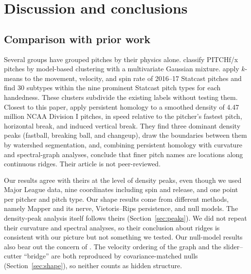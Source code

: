 \documentclass{article}
\theoremstyle{definition}
\theoremstyle{remark}
\begin{document}
\section{Discussion and conclusions}\label{sec:discussion}
\subsection{Comparison with prior work}\label{sec:prior}
Several groups have grouped pitches by their physics alone.
\textcite{pane2013trouble} classify PITCHf/x pitches by model-based clustering with a multivariate Gaussian mixture.
\textcite{camp2020clustering} apply $k$-means to the movement, velocity, and spin rate of 2016--17 Statcast pitches and find 30 subtypes within the nine prominent Statcast pitch types for each handedness. These clusters subdivide the existing labels without testing them.
Closest to this paper, \textcite{maloof2026classify} apply persistent homology to a smoothed density of 4.47 million NCAA Division I pitches, in speed relative to the pitcher's fastest pitch, horizontal break, and induced vertical break.
They find three dominant density peaks (fastball, breaking ball, and changeup), draw the boundaries between them by watershed segmentation, and, combining persistent homology with curvature and spectral-graph analyses, conclude that finer pitch names are locations along continuous ridges. Their article is not peer-reviewed.

Our results agree with theirs at the level of density peaks, even though we used Major League data, nine coordinates including spin and release, and one point per pitcher and pitch type.
Our shape results come from different methods, namely Mapper and its nerve, Vietoris--Rips persistence, and null models. The density-peak analysis itself follows theirs (Section~\ref{sec:peaks}).
We did not repeat their curvature and spectral analyses, so their conclusion about ridges is consistent with our picture but not something we tested.
Our null-model results also bear out the concern of \textcite{topaz2026null}. The velocity ordering of the graph and the slider--cutter ``bridge'' are both reproduced by covariance-matched nulls (Section~\ref{sec:shape}), so neither counts as hidden structure.
\end{document}
